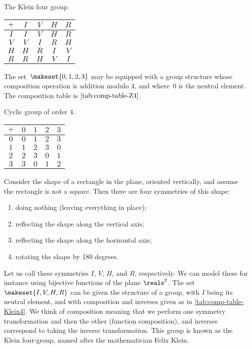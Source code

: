 \begin{margintable}
    \caption{The Klein four group}
    \label{tab:comp-table-Klein4}
    \centering
    \begin{tabular}{c|cccc}
        $+$ & $I$ & $V$ & $H$ & $R$ \\
        \hline
        $I$ & $I$ & $V$ & $H$ & $R$ \\
        $V$ & $V$ & $I$ & $R$ & $H$ \\
        $H$ & $H$ & $R$ & $I$ & $V$ \\
        $R$ & $R$ & $H$ & $V$ & $I$
    \end{tabular}
\end{margintable}

\begin{example}
    \label{exa:grp-Z4}
    The set~$\makeset{0, 1, 2, 3 }$ may be equipped with a group structure whose composition operation is addition modulo 4, and where~$0$ is the neutral element.
    The composition table is $\cref{tab:comp-table-Z4}$.
    \begin{margintable}
        \caption{Cyclic group of order 4.}
        \label{tab:comp-table-Z4}
        \centering
        \begin{tabular}{c|cccc}
            $+$ & $0$ & $1$ & $2$ & $3$ \\
            \hline
            $0$ & $0$ & $1$ & $2$ & $3$ \\
            $1$ & $1$ & $2$ & $3$ & $0$ \\
            $2$ & $2$ & $3$ & $0$ & $1$ \\
            $3$ & $3$ & $0$ & $1$ & $2$
        \end{tabular}
    \end{margintable}
\end{example}

\begin{example}
    \label{exa:grp-Klein4}
    Consider the shape of a rectangle in the plane, oriented vertically, and assume the rectangle is not a square.
    Then there are four symmetries of this shape:
    \begin{enumerate}
        \item doing nothing (leaving everything in place);
        \item reflecting the shape along the vertical axis;
        \item reflecting the shape along the horizontal axis;
        \item rotating the shape by 180 degrees.
    \end{enumerate}
    Let us call these symmetries $I$, $V$, $H$, and $R$, respectively.
    We can model these for instance using bijective functions of the plane $\reals^2$.
    The set $\makeset{I, V, H, R}$ can be given the structure of a group, with $I$ being its neutral element, and with composition and inverses given as in \cref{tab:comp-table-Klein4}.
    We think of composition meaning that we perform one symmetry transformation and then the other (function composition), and inverses correspond to taking the inverse transformation.
    This group is known as the Klein four-group, named after the mathematician Felix Klein.
\end{example}


